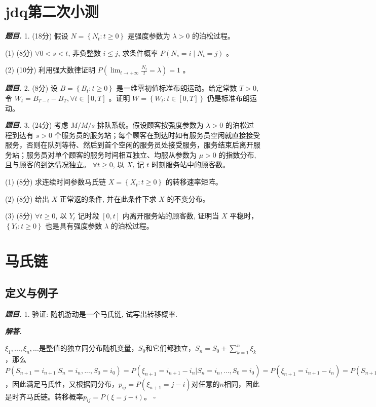 \documentclass[10pt, a4paper, oneside]{ctexart}
\newenvironment{problem}{\begin{framed}\par\noindent\textbf{\textit{题目. }}}{\end{framed}\par}
\newenvironment{solution}{%
  \par\noindent\textbf{\textit{解答. }}\ignorespaces
}{%
  \hfill\ensuremath{\square}\par %
}
\begin{document}
\section{jdq第二次小测}

\begin{problem}
    1. (18分) 假设 $N=\left\{N_t: t \geq 0\right\}$ 是强度参数为 $\lambda>0$ 的泊松过程。 

(1) (8分) $\forall 0<s<t$, 非负整数 $i \leq j$, 求条件概率 $P\left(N_s=i \mid N_t=j\right)$ 。

(2) (10分) 利用强大数律证明 $P\left(\lim _{t \rightarrow+\infty} \frac{N_t}{t}=\lambda\right)=1$ 。
\end{problem}

\begin{problem}
    2. (8分) 设 $B=\left\{B_t: t \geq 0\right\}$ 是一维零初值标准布朗运动。给定常数 $T>0$,令 $W_t=B_{T-t}-B_T, \forall t \in[0, T]$ 。证明 $W=\left\{W_t: t \in[0, T]\right\}$ 仍是标准布朗运动。
\end{problem}


\begin{problem}
    3. (24分) 考虑 $M / M / s$ 排队系统。假设顾客按强度参数为 $\lambda>0$ 的泊松过程到达有 $s>0$ 个服务员的服务站；每个顾客在到达时如有服务员空闲就直接接受服务，否则在队列等待、然后到首个空闲的服务员处接受服务，服务结束后离开服务站；服务员对单个顾客的服务时间相互独立、均服从参数为 $\mu>0$ 的指数分布, 且与顾客的到达情况独立。 $\forall t \geq 0$, 以 $X_t$ 记 $t$ 时刻服务站中的顾客数。

(1) (8分) 求连续时间参数马氏链 $X=\left\{X_t: t \geq 0\right\}$ 的转移速率矩阵。

(2) (8分) 给出 $X$ 正常返的条件, 并在此条件下求 $X$ 的不变分布。

(3) (8分) $\forall t \geq 0$, 以 $Y_t$ 记时段 $[0, t]$ 内离开服务站的顾客数, 证明当 $X$ 平稳时， $\left\{Y_t: t \geq 0\right\}$ 也是具有强度参数 $\lambda$ 的泊松过程。
\end{problem}

\section{马氏链}
\subsection{定义与例子}
\begin{problem}
1. 验证: 随机游动是一个马氏链, 试写出转移概率.
\end{problem}
\begin{solution}
$\xi_1,...,\xi_n,...$是整值的独立同分布随机变量，$S_0$和它们都独立，$S_n=S_0+\sum_{k=1}^n \xi_k$，那么$P(S_{n+1}=i_{n+1}|S_n=i_n,...,S_0=i_0)=P(\xi_{n+1}=i_{n+1}-i_{n}|S_n=i_n,...,S_0=i_0)=P(\xi_{n+1}=i_{n+1}-i_{n})=P(S_{n+1}=i_{n+1}|S_{n}=i_{n})$，因此满足马氏性，又根据同分布，$p_{ij}=P(\xi_{n+1}=j-i)$对任意的$n$相同，因此是时齐马氏链。转移概率$p_{ij}=P(\xi=j-i)$。
\end{solution}
\end{document}
